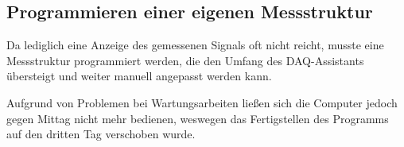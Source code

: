 	\newpage
	\subsection{Programmieren einer eigenen Messstruktur}
	
		Da lediglich eine Anzeige des gemessenen Signals oft nicht reicht, musste eine Messstruktur programmiert werden, die den Umfang des DAQ-Assistants übersteigt und weiter manuell angepasst werden kann.
		
		Aufgrund von Problemen bei Wartungsarbeiten ließen sich die Computer jedoch gegen Mittag nicht mehr bedienen, weswegen das Fertigstellen des Programms auf den dritten Tag verschoben wurde. 
	